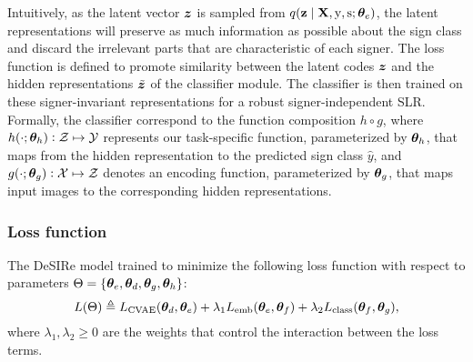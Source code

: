 Intuitively, as the latent vector ${\bm{z}}$ is sampled from $q({\mathbf{z}} \mid {\mathbf{X}}, {\textnormal{y}}, {\textnormal{s}}; {\bm{\theta}}_e)$, the latent representations will preserve as much information as possible about the sign class and discard the irrelevant parts that are characteristic of each signer. The loss function is defined to promote similarity between the latent codes ${\bm{z}}$ and the hidden representations $\tilde{{\bm{z}}}$ of the classifier module. The classifier is then trained on these signer-invariant representations for a robust signer-independent SLR. Formally, the classifier correspond to the function composition $h \circ g$, where $h(\cdot; {\bm{\theta}}_h): {\mathcal{Z}} \mapsto {\mathcal{Y}}$ represents our task-specific function, parameterized by ${\bm{\theta}}_h$, that maps from the hidden representation to the predicted sign class $\hat{y}$, and $g(\cdot; {\bm{\theta}}_g): {\mathcal{X}} \mapsto {\mathcal{Z}}$ denotes an encoding function, parameterized by ${\bm{\theta}}_g$, that maps input images to the corresponding hidden representations.

\subsubsection{Loss function}
\label{sec:desire_loss}
The DeSIRe model trained to minimize the following loss function with respect to parameters $\Theta=\{{\bm{\theta}}_{e},{\bm{\theta}}_{d},{\bm{\theta}}_{g},{\bm{\theta}}_{h}\}$:
\begin{equation}
    L(\Theta) \triangleq L_{\text{CVAE}}({\bm{\theta}}_{d},{\bm{\theta}}_{e}) + \lambda_{1} L_{\text{emb}}({\bm{\theta}}_{e},{\bm{\theta}}_{f}) + \lambda_{2} L_{\text{class}}({\bm{\theta}}_{f},{\bm{\theta}}_{g}),
\end{equation}
where $\lambda_{1},\lambda_{2}\geq 0$ are the weights that control the interaction between the loss terms.

